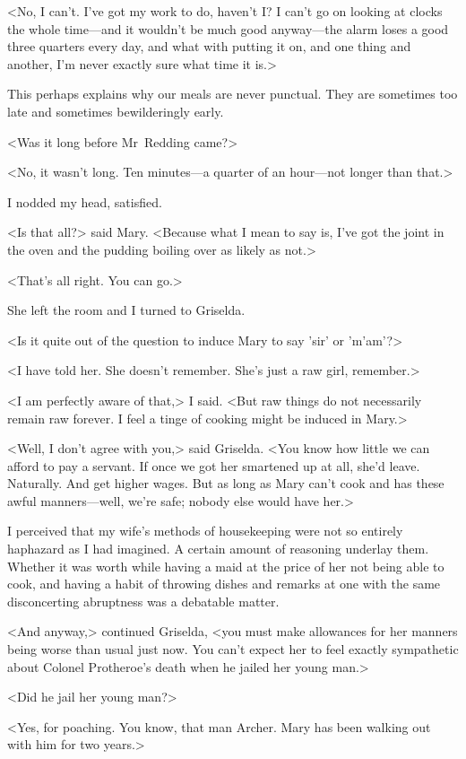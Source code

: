 <No, I can't. I've got my work to do, haven't I? I can't go on looking at clocks the whole time—and it wouldn't be much good anyway—the alarm loses a good three quarters every day, and what with putting it on, and one thing and another, I'm never exactly sure what time it is.>

This perhaps explains why our meals are never punctual. They are sometimes too late and sometimes bewilderingly early.

<Was it long before Mr~Redding came?>

<No, it wasn't long. Ten minutes—a quarter of an hour—not longer than that.>

I nodded my head, satisfied.

<Is that all?> said Mary. <Because what I mean to say is, I've got the joint in the oven and the pudding boiling over as likely as not.>

<That's all right. You can go.>

She left the room and I turned to Griselda.

<Is it quite out of the question to induce Mary to say 'sir' or 'm'am'?>

<I have told her. She doesn't remember. She's just a raw girl, remember.>

<I am perfectly aware of that,> I said. <But raw things do not necessarily remain raw forever. I feel a tinge of cooking might be induced in Mary.>

<Well, I don't agree with you,> said Griselda. <You know how little we can afford to pay a servant. If once we got her smartened up at all, she'd leave. Naturally. And get higher wages. But as long as Mary can't cook and has these awful manners—well, we're safe; nobody else would have her.>

I perceived that my wife's methods of housekeeping were not so entirely haphazard as I had imagined. A certain amount of reasoning underlay them. Whether it was worth while having a maid at the price of her not being able to cook, and having a habit of throwing dishes and remarks at one with the same disconcerting abruptness was a debatable matter.

<And anyway,> continued Griselda, <you must make allowances for her manners being worse than usual just now. You can't expect her to feel exactly sympathetic about Colonel Protheroe's death when he jailed her young man.>

<Did he jail her young man?>

<Yes, for poaching. You know, that man Archer. Mary has been walking out with him for two years.>

